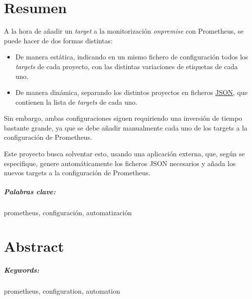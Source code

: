 \chapter*{Resumen}
\label{ch:resumen}

A la hora de añadir un \textit{target} a la monitorización \textit{onpremise} con Prometheus, se puede hacer de dos formas distintas:

\begin{itemize}
  \item De manera estática, indicando en un mismo fichero de configuración todos los \textit{targets} de cada proyecto, con las distintas variaciones de etiquetas de cada uno.
  \item De manera dinámica, separando los distintos proyectos en ficheros \url{JSON}, que contienen la lista de \textit{targets} de cada uno.
\end{itemize}

Sin embargo, ambas configuraciones siguen requiriendo una inversión de tiempo bastante grande, ya que se debe añadir manualmente cada uno de los targets a la configuración de Prometheus.

Este proyecto busca solventar esto, usando una aplicación externa, que, según se especifique, genere automáticamente los ficheros JSON necesarios y añada los nuevos targets a la configuración de Prometheus.

\paragraph*{Palabras clave:} prometheus, configuración, automatización


\newpage
    
\chapter*{Abstract}
\label{ch:abstract}


\paragraph*{Keywords:} prometheus, configuration, automation